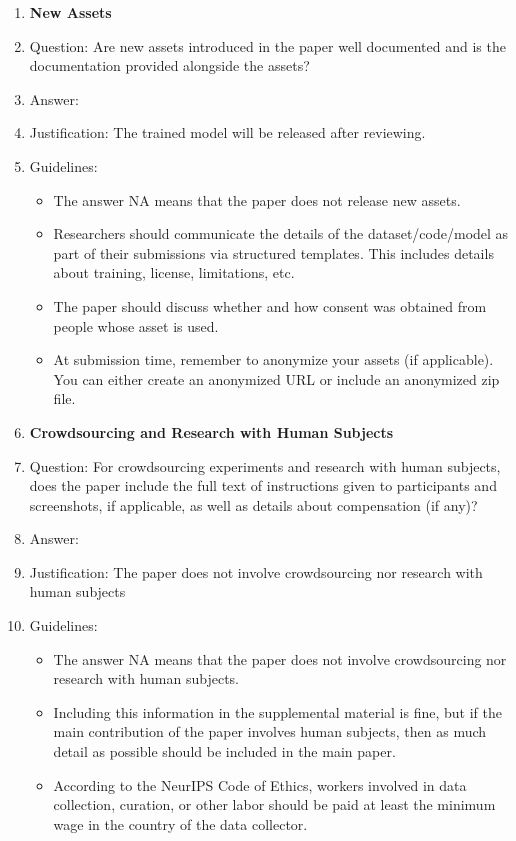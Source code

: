 \documentclass{article}
\begin{document}
\begin{enumerate}
\item {\bf New Assets}
    \item[] Question: Are new assets introduced in the paper well documented and is the documentation provided alongside the assets?
    \item[] Answer: \answerYes{}{} %
    \item[] Justification: The trained model will be released after reviewing.
    \item[] Guidelines:
    \begin{itemize}
        \item The answer NA means that the paper does not release new assets.
        \item Researchers should communicate the details of the dataset/code/model as part of their submissions via structured templates. This includes details about training, license, limitations, etc. 
        \item The paper should discuss whether and how consent was obtained from people whose asset is used.
        \item At submission time, remember to anonymize your assets (if applicable). You can either create an anonymized URL or include an anonymized zip file.
    \end{itemize}

\item {\bf Crowdsourcing and Research with Human Subjects}
    \item[] Question: For crowdsourcing experiments and research with human subjects, does the paper include the full text of instructions given to participants and screenshots, if applicable, as well as details about compensation (if any)? 
    \item[] Answer: \answerNA{} %
    \item[] Justification: The paper does not involve crowdsourcing nor research with human subjects
    \item[] Guidelines:
    \begin{itemize}
        \item The answer NA means that the paper does not involve crowdsourcing nor research with human subjects.
        \item Including this information in the supplemental material is fine, but if the main contribution of the paper involves human subjects, then as much detail as possible should be included in the main paper. 
        \item According to the NeurIPS Code of Ethics, workers involved in data collection, curation, or other labor should be paid at least the minimum wage in the country of the data collector. 
    \end{itemize}


\end{enumerate}
\end{document}
